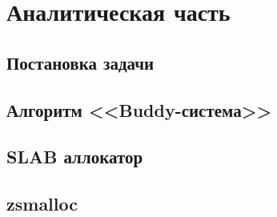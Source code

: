 \section{Аналитическая часть}

\subsection{Постановка задачи}

\subsection{Алгоритм <<Buddy-система>> }

\subsection{SLAB аллокатор}

\subsection{zsmalloc}



\pagebreak
